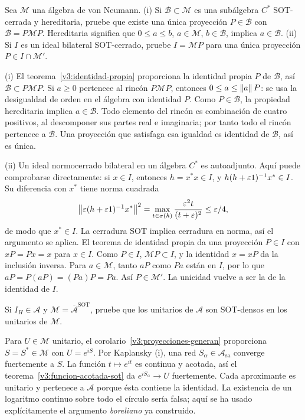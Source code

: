 \begin{ejercicio}\label{ej:v3-l33-1}
Sea $\mathcal M$ una álgebra de von Neumann. (i) Si $\mathcal B\subset\mathcal M$ es una subálgebra $C^*$ SOT-cerrada y hereditaria, pruebe que existe una única proyección $P\in\mathcal B$ con $\mathcal B=P\mathcal M P$. Hereditaria significa que $0\le a\le b$, $a\in\mathcal M$, $b\in\mathcal B$, implica $a\in\mathcal B$. (ii) Si $I$ es un ideal bilateral SOT-cerrado, pruebe $I=\mathcal M P$ para una única proyección $P\in I\cap\mathcal M'$.
\end{ejercicio}
\begin{solucion}
(i) El teorema~\ref{v3:identidad-propia} proporciona la identidad propia $P$ de $\mathcal B$, así $\mathcal B\subset P\mathcal M P$. Si $a\ge0$ pertenece al rincón $P\mathcal M P$, entonces $0\le a\le\left\lVert a\right\rVert P$: se usa la desigualdad de orden en el álgebra con identidad $P$. Como $P\in\mathcal B$, la propiedad hereditaria implica $a\in\mathcal B$. Todo elemento del rincón es combinación de cuatro positivos, al descomponer sus partes real e imaginaria; por tanto todo el rincón pertenece a $\mathcal B$. Una proyección que satisfaga esa igualdad es identidad de $\mathcal B$, así es única.

(ii) Un ideal normocerrado bilateral en un álgebra $C^*$ es autoadjunto. Aquí puede comprobarse directamente: si $x\in I$, entonces $h=x^*x\in I$, y $h(h+\varepsilon1)^{-1}x^*\in I$. Su diferencia con $x^*$ tiene norma cuadrada
\[
 \left\lVert\varepsilon(h+\varepsilon1)^{-1}x^*\right\rVert^2
 =\max_{t\in\sigma(h)}\frac{\varepsilon^2t}{(t+\varepsilon)^2}\le\varepsilon/4,
\]
de modo que $x^*\in I$. La cerradura SOT implica cerradura en norma, así el argumento se aplica. El teorema de identidad propia da una proyección $P\in I$ con $xP=Px=x$ para $x\in I$. Como $P\in I$, $\mathcal M P\subset I$, y la identidad $x=xP$ da la inclusión inversa. Para $a\in\mathcal M$, tanto $aP$ como $Pa$ están en $I$, por lo que $aP=P(aP)=(Pa)P=Pa$. Así $P\in\mathcal M'$. La unicidad vuelve a ser la de la identidad de $I$.
\end{solucion}

\begin{ejercicio}\label{ej:v3-l33-2}
Si $I_H\in\mathcal A$ y $\mathcal M=\overline{\mathcal A}^{\mathrm{SOT}}$, pruebe que los unitarios de $\mathcal A$ son SOT-densos en los unitarios de $\mathcal M$.
\end{ejercicio}
\begin{solucion}
Para $U\in\mathcal M$ unitario, el corolario~\ref{v3:proyecciones-generan} proporciona $S=S^*\in\mathcal M$ con $U=e^{iS}$. Por Kaplansky (i), una red $S_\alpha\in\mathcal A_{\mathrm{sa}}$ converge fuertemente a $S$. La función $t\mapsto e^{it}$ es continua y acotada, así el teorema~\ref{v3:funcion-acotada-sot} da $e^{iS_\alpha}\to U$ fuertemente. Cada aproximante es unitario y pertenece a $\mathcal A$ porque ésta contiene la identidad. La existencia de un logaritmo continuo sobre todo el círculo sería falsa; aquí se ha usado explícitamente el argumento \emph{boreliano} ya construido.
\end{solucion}

